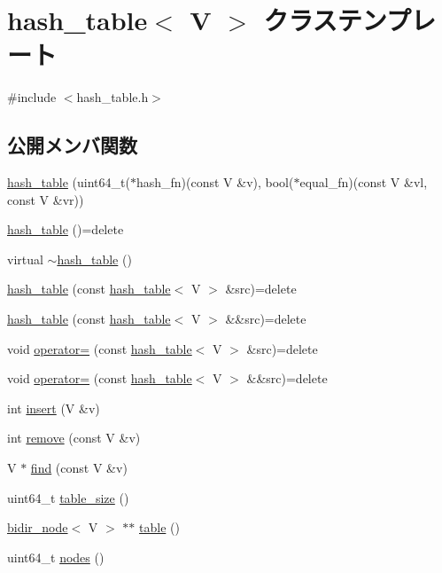 \hypertarget{classhash__table}{}\section{hash\+\_\+table$<$ V $>$ クラステンプレート}
\label{classhash__table}


{\ttfamily \#include $<$hash\+\_\+table.\+h$>$}

\subsection*{公開メンバ関数}
\begin{DoxyCompactItemize}
\item 
\hyperlink{classhash__table_a5e4a74748ecad78e798739a03be056cb}{hash\+\_\+table} (uint64\+\_\+t($\ast$hash\+\_\+fn)(const V \&v), bool($\ast$equal\+\_\+fn)(const V \&vl, const V \&vr))
\item 
\hyperlink{classhash__table_aa71d6ba6b69c0cc05713feeb39b25a30}{hash\+\_\+table} ()=delete
\item 
virtual \hyperlink{classhash__table_ada4ba869398b6330ed4d8366cbad3659}{$\sim$hash\+\_\+table} ()
\item 
\hyperlink{classhash__table_a30a71ef67b26dc4ec16a56c003105c9a}{hash\+\_\+table} (const \hyperlink{classhash__table}{hash\+\_\+table}$<$ V $>$ \&src)=delete
\item 
\hyperlink{classhash__table_a9c397149a5b8e6766ada4b23ec7344de}{hash\+\_\+table} (const \hyperlink{classhash__table}{hash\+\_\+table}$<$ V $>$ \&\&src)=delete
\item 
void \hyperlink{classhash__table_a22982acf5d5ba36d8ed199b2f6b25bd0}{operator=} (const \hyperlink{classhash__table}{hash\+\_\+table}$<$ V $>$ \&src)=delete
\item 
void \hyperlink{classhash__table_a770e1e703ae71c41f18ff727882ae4ed}{operator=} (const \hyperlink{classhash__table}{hash\+\_\+table}$<$ V $>$ \&\&src)=delete
\item 
int \hyperlink{classhash__table_a9e02312051be1517ad16ee8164af07dd}{insert} (V \&v)
\item 
int \hyperlink{classhash__table_a8ac0d9136be9250f7059d07099a4393e}{remove} (const V \&v)
\item 
V $\ast$ \hyperlink{classhash__table_ae6968f84ffa245688a2fd8eebb86e7a6}{find} (const V \&v)
\item 
uint64\+\_\+t \hyperlink{classhash__table_a2ae018dc5310c3bf887dec199a445eeb}{table\+\_\+size} ()
\item 
\hyperlink{classbidir__node}{bidir\+\_\+node}$<$ V $>$ $\ast$$\ast$ \hyperlink{classhash__table_ace4fefe428377b31e479f516aad83e72}{table} ()
\item 
uint64\+\_\+t \hyperlink{classhash__table_accb6f8935ae8965655975426140d9447}{nodes} ()
\end{DoxyCompactItemize}

